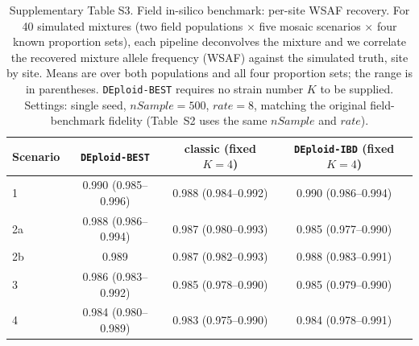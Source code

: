 \begin{table}[t]
\centering
\caption{Supplementary Table S3. Field in-silico benchmark: per-site WSAF recovery.
For 40 simulated mixtures (two field populations $\times$ five mosaic scenarios $\times$ four
known proportion sets), each pipeline deconvolves the mixture and we correlate the
recovered mixture allele frequency (WSAF) against the simulated truth, site by site.
Means are over both populations and all four proportion sets; the range is in parentheses.
{\tt DEploid-BEST} requires no strain number $K$ to be supplied.
Settings: single seed, $nSample=500$, $rate=8$, matching the original field-benchmark
fidelity (Table~S2 uses the same $nSample$ and $rate$).}
\label{tab:field}
\begin{tabular}{lccc}
\hline
Scenario & {\tt DEploid-BEST} & classic (fixed $K{=}4$) & {\tt DEploid-IBD} (fixed $K{=}4$) \\
\hline
1 & 0.990 (0.985--0.996) & 0.988 (0.984--0.992) & 0.990 (0.986--0.994)  \\
2a & 0.988 (0.986--0.994) & 0.987 (0.980--0.993) & 0.985 (0.977--0.990) \\
2b & 0.989 & 0.987 (0.982--0.993) & 0.988 (0.983--0.991) \\
3 & 0.986 (0.983--0.992) & 0.985 (0.978--0.990) & 0.985 (0.979--0.990)  \\
4 & 0.984 (0.980--0.989) & 0.983 (0.975--0.990) & 0.984 (0.978--0.991)  \\
\hline
\end{tabular}
\end{table}
